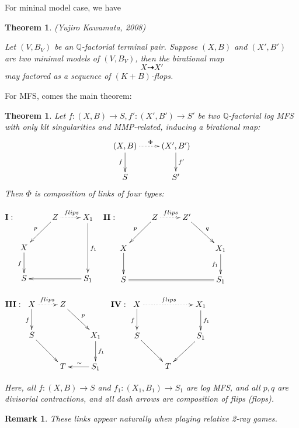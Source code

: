 \documentclass{article}
\newtheorem{thm}[defn]{Theorem}
\newtheorem{rmk}[defn]{Remark}
\begin{document}
For mininal model case, we have
\begin{thm}
  (Yujiro Kawamata, 2008)

  Let $ (V,B_V) $ be an $ \mathbb{Q} $-factorial terminal  pair. Suppose $ (X,B) $ and $ (X',B') $ are two minimal models of $ (V,B_V) $, then the birational map
  $$ X\dashrightarrow X' $$
  may factored as a sequence of $ (K+B) $-flops.
\end{thm}
For MFS, comes  the main theorem:
\begin{thm}
  Let $ f:(X,B)\to S,f':(X',B')\to S' $ be two $ \mathbb{Q} $-factorial log MFS  with only klt singularities and MMP-related, inducing a birational map:
  $$ \xymatrix{
    (X,B)\ar[d]_f\ar@{.>}[r]^\Phi&(X',B')\ar[d]^{f'}\\
  S&S'} $$
  Then $ \Phi  $ is composition  of links of  four types:

  $ \textbf{I} : \xymatrix{
    &Z\ar[ld]_p\ar@{.>}[r]^{flips}&X_1\ar[dd]^{f_1}\\
    X\ar[d]_f&&\\
  S &&S_1\ar[ll]}$
  $ \textbf{II} : \xymatrix{
    &Z\ar[ld]_p\ar@{.>}[r]^{flips}&Z'\ar[dr]^{q}&\\
    X\ar[d]&&&X_1\ar[d]_{f_1}\\
  S\ar@{=}[rrr]&&&S_1} $

  $ \textbf{III} :\xymatrix{
    X\ar[d]_f\ar@{.>}[r]^{flips}&Z\ar[rd]^{p}&\\
    S\ar[dr]&&X_1\ar[d]^{f_1}\\
  &T&S_1\ar[l]_\sim}$
  $  \textbf{IV}:\xymatrix{
    X\ar[d]_f\ar@{.>}[rr]^{flips}&&X_1\ar[d]^{f_1}\\
    S\ar[dr]&&S_1\ar[dl]\\
  &T &}$

  Here, all $ f:(X,B)\to S $ and $ f_1:(X_1,B_1)\to S_1 $ are log MFS, and all $ p,q $ are divisorial contractions, and all dash arrows are composition of flips (flops).
\end{thm}
\begin{rmk}
  These links appear naturally when playing relative 2-ray games.
\end{rmk}
\end{document}
